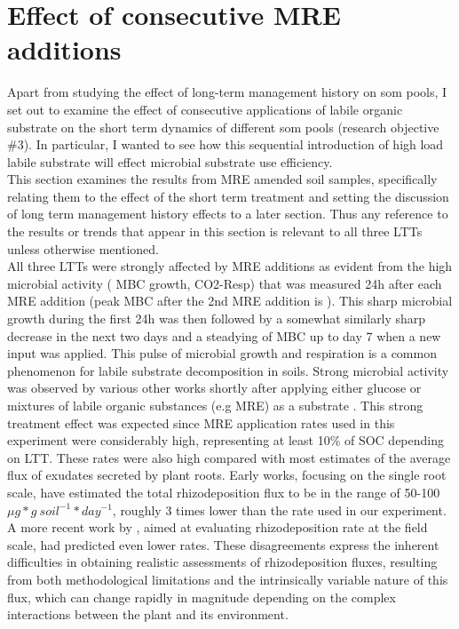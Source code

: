 \section{Effect of consecutive MRE additions}
Apart from studying the effect of long-term management history on \gls{som} pools, I set out to examine the effect of consecutive applications of labile organic substrate on the short term dynamics of different \gls{som} pools (research objective \#3). In particular, I wanted to see how this sequential introduction of high load labile substrate will effect microbial substrate use efficiency.\\
This section examines the results from MRE amended soil samples, specifically relating them to the effect of the short term treatment and setting the discussion of long term management history effects to a later section. Thus any reference to the results or trends that appear in this section is relevant to all three LTTs unless otherwise mentioned.\\
All three LTTs were strongly affected by MRE additions as evident from the high microbial activity ( MBC growth, CO2-Resp) that was measured 24h after each MRE addition (peak MBC after the 2nd MRE addition is  ). This sharp microbial growth during the first 24h was then followed by a somewhat similarly sharp decrease  in the next two days and a steadying of MBC up to day 7 when a new input was applied. This pulse of microbial growth and respiration is a common phenomenon for labile substrate decomposition in soils.
Strong microbial activity was  observed by various other works shortly after applying either glucose or mixtures of labile organic substances (e.g MRE) as a substrate \citep{hill2008, landi2006, traore2000}.
This strong treatment effect was expected since MRE application rates used in this experiment were considerably high, representing at least 10\% of SOC depending on LTT. These rates were also high compared with most estimates of the average flux of exudates secreted by plant roots. Early works, focusing on the single root scale, have estimated the total rhizodeposition flux to be in the range of 50-100 $ \mu g * g\ soil^{-1} * day^{-1} $, roughly 3 times lower than the rate used in our experiment. A more recent work by \citet{pausch2018}, aimed at evaluating rhizodeposition rate at the field scale, had predicted even lower rates. These disagreements express the inherent difficulties in obtaining realistic assessments of rhizodeposition fluxes, resulting from both methodological limitations and the intrinsically variable nature of this flux, which can change rapidly in magnitude depending  on the complex interactions between the plant and its environment.

